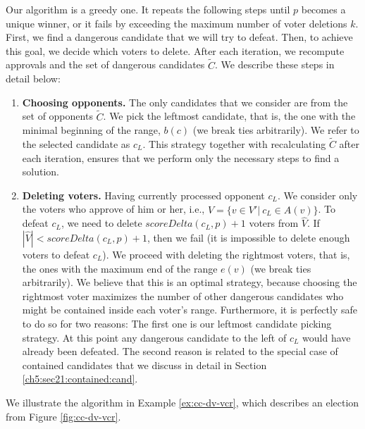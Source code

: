 Our algorithm is a greedy one.
It repeats the following steps until $p$ becomes a unique winner,
or it fails by exceeding the maximum number of voter deletions $k$.
First, we find a dangerous candidate that we will try to defeat. 
Then, to achieve this goal, we decide which voters to delete.
After each iteration, we recompute approvals and the set of dangerous candidates $\widetilde{C}$.
We describe these steps in detail below:
\begin{enumerate}
    \item \textbf{Choosing opponents.} 
    The only candidates that we consider are from the set of opponents $\widetilde{C}$.
    We pick the leftmost candidate, that is, the one with the minimal beginning of the range, $b(c)$ (we break ties arbitrarily).
    We refer to the selected candidate as $c_L$. This strategy together with recalculating $\widetilde{C}$ after each iteration,
    ensures that we perform only the necessary steps to find a solution. 

    \item \textbf{Deleting voters.}
    Having currently processed opponent $c_L$.
    We consider only the voters who approve of him or her,
    i.e., $\widehat{V} = \{v \in V' | \: c_L \in A(v)\}$.
    To defeat $c_L$, we need to delete $scoreDelta(c_L,p) + 1$ voters from $\widehat{V}$.
    If $|\widehat{V}| < scoreDelta(c_L,p) + 1$, then we fail (it is impossible to delete enough voters to defeat $c_L$).
    We proceed with deleting the rightmost voters, that is, the ones with the maximum end of the range $e(v)$ (we break ties arbitrarily).
    We believe that this is an optimal strategy,
    because choosing the rightmost voter maximizes the number of other dangerous candidates who might be contained inside each voter's range.
    Furthermore, it is perfectly safe to do so for two reasons:
    The first one is our leftmost candidate picking strategy. 
    At this point any dangerous candidate to the left of $c_L$ would have already been defeated.
    The second reason is related to the special case of contained candidates that we discuss in detail in Section \ref{ch5:sec21:contained:cand}. 
\end{enumerate}
We illustrate the algorithm in Example \ref{ex:cc-dv-vcr}, which describes an election from Figure \ref{fig:cc-dv-vcr}.
%
%
